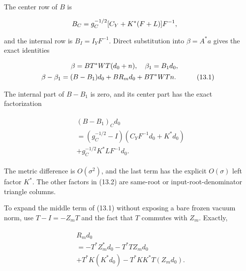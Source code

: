 The center row of \(B\) is

\begin{gather*}
\begin{aligned}
& B_{C}=g_{C}^{-1/2}[C_{Y}+K^{*}(F+L)]F^{-1},
\end{aligned}\notag
\end{gather*}

and the internal row is \(B_{I}=I_{Y} F^{-1}\). Direct substitution into
\(\beta =A^{*}a\) gives the exact identities

\begin{gather*}
\begin{aligned}
& \beta =B T^{*}WT(d_{0}+n), \quad  \beta _{1}=B_{1} d_{0},
\end{aligned}\notag \\
\begin{aligned}
& \beta -\beta _{1}=(B-B_{1})d_{0}+B R_{m} d_{0}+B T^{*}WT n.
\end{aligned}\tag{13.1}
\end{gather*}

The internal part of \(B-B_{1}\) is zero, and its center part has the
exact factorization

\begin{gather*}
\begin{aligned}
& (B-B_{1})_{C} d_{0} \\
& =(g_{C}^{-1/2}-I)(C_{Y} F^{-1}d_{0}+K^{*}d_{0}) \\
& +g_{C}^{-1/2}K^{*} L F^{-1}d_{0}.
\end{aligned}\tag{13.2}
\end{gather*}

The metric difference is \(O(\sigma ^{2})\), and the last term has the
explicit \(O(\sigma )\) left factor \(K^{*}\). The other factors in
(13.2) are same-root or input-root-denominator triangle columns.

To expand the middle term of (13.1) without exposing a bare frozen
vacuum norm, use \(T-I=-Z_{m} T\) and the fact that \(T\) commutes with
\(Z_{m}\). Exactly,

\begin{gather*}
\begin{aligned}
& R_{m} d_{0} \\
& =-T^{*} Z_{m}^{*}d_{0} -T^{*}T Z_{m} d_{0} \\
& +T^{*}K(K^{*}d_{0})-T^{*}KK^{*}T(Z_{m} d_{0}).
\end{aligned}\tag{13.3}
\end{gather*}

